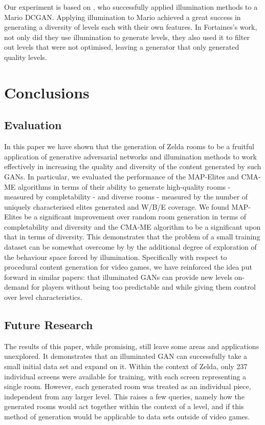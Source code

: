\documentclass{article}
\begin{document}
Our experiment is based on \cite{Fontaine2020}, who successfully applied illumination methods to a Mario DCGAN. Applying illumination to Mario achieved a great success in generating a diversity of levels each with their own features. In Fortaines's work, not only did they use illumination to generate levels, they also used it to filter out levels that were not optimised, leaving a generator that only generated quality levels. 
\section{Conclusions}

\subsection{Evaluation}
In this paper we have shown that the generation of Zelda rooms to be a fruitful application of generative adversarial networks and illumination methods to work effectively in increasing the quality and diversity of the content generated by such GANs. In particular, we evaluated the performance of the MAP-Elites and CMA-ME algorithms in terms of their ability to generate high-quality rooms - measured by completability - and diverse rooms - measured by the number of uniquely characterised elites generated and W/B/E coverage. We found MAP-Elites be a significant improvement over random room generation in terms of completability and diversity and the CMA-ME algorithm to be a significant upon that in terms of diversity. This demonstrates that the problem of a small training dataset can be somewhat overcome by by the additional degree of exploration of the behaviour space forced by illumination. Specifically with respect to procedural content generation for video games, we have reinforced the idea put forward in similar papers: that illuminated GANs can provide new levels on-demand for players without being too predictable and while giving them control over level characteristics.

\subsection{Future Research}
The results of this paper, while promising, still leave some areas and applications unexplored. It demonstrates that an illuminated GAN can successfully take a small initial data set and expand on it. Within the context of Zelda, only 237 individual screens were available for training, with each screen representing a single room. However, each generated room was treated as an individual piece, independent from any larger level. This raises a few queries, namely how the generated rooms would act together within the context of a level, and if this method of generation would be applicable to data sets outside of video games.%
\end{document}

